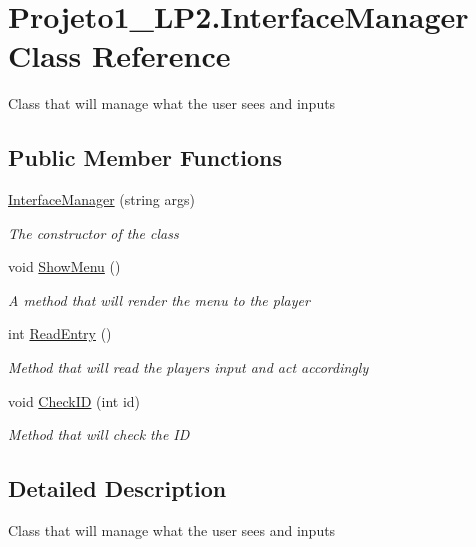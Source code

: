 \hypertarget{class_projeto1___l_p2_1_1_interface_manager}{}\section{Projeto1\+\_\+\+L\+P2.\+Interface\+Manager Class Reference}
\label{class_projeto1___l_p2_1_1_interface_manager}


Class that will manage what the user sees and inputs  


\subsection*{Public Member Functions}
\begin{DoxyCompactItemize}
\item 
\hyperlink{class_projeto1___l_p2_1_1_interface_manager_ab7e0f4ab529ccb9404b447780aca5b5c}{Interface\+Manager} (string args)
\begin{DoxyCompactList}\small\item\em The constructor of the class \end{DoxyCompactList}\item 
void \hyperlink{class_projeto1___l_p2_1_1_interface_manager_ae39278d41a699c7193d041daafd406af}{Show\+Menu} ()
\begin{DoxyCompactList}\small\item\em A method that will render the menu to the player \end{DoxyCompactList}\item 
int \hyperlink{class_projeto1___l_p2_1_1_interface_manager_a5f37f21c65d90767a37ff8ae13deed34}{Read\+Entry} ()
\begin{DoxyCompactList}\small\item\em Method that will read the player\textquotesingle{}s input and act accordingly \end{DoxyCompactList}\item 
void \hyperlink{class_projeto1___l_p2_1_1_interface_manager_a8b5597c81adbaca5791f7df826ead221}{Check\+ID} (int id)
\begin{DoxyCompactList}\small\item\em Method that will check the ID \end{DoxyCompactList}\end{DoxyCompactItemize}


\subsection{Detailed Description}
Class that will manage what the user sees and inputs 



